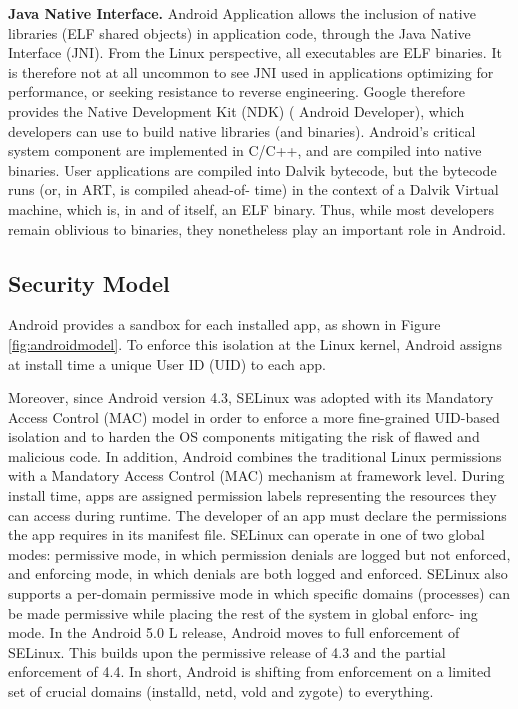 \textbf{Java Native Interface.} Android Application allows the inclusion of native libraries (ELF shared objects) in application code, through the Java Native Interface (JNI).
From the Linux perspective, all executables are ELF binaries. It is therefore not at all uncommon to see JNI used in applications optimizing for performance, or seeking resistance to reverse engineering. Google therefore provides the Native Development Kit (NDK) (                Android Developer), which developers can use to build native libraries (and binaries). Android's critical system  component are implemented in C/C++, and are compiled into native binaries. User applications are compiled into Dalvik bytecode, but the bytecode runs (or, in ART, is compiled ahead-of- time) in the context of a Dalvik Virtual machine, which is, in and of itself, an ELF binary. Thus, while most developers remain oblivious to binaries, they nonetheless play an important role in Android.



\subsection{Security Model} 
Android provides a sandbox for each installed app, as shown in Figure \ref{fig:androidmodel}. To enforce this isolation at the Linux kernel, Android assigns at install time a unique User ID (UID) to each app. 

Moreover, since Android version 4.3, SELinux was adopted with its Mandatory Access Control (MAC) model in order  to enforce a more fine-grained UID-based isolation and to harden the OS components mitigating the risk of flawed and malicious code.  In addition, Android combines the traditional Linux permissions with a Mandatory Access Control (MAC) mechanism at framework level. During install time, apps are assigned permission labels representing the resources they can access during runtime. The developer of an app must declare the permissions the app requires in its manifest file. SELinux can operate in one of two global modes: permissive mode, in which permission denials are logged but not enforced, and enforcing mode, in which denials are both logged and enforced. SELinux also supports a per-domain permissive mode in which specific domains (processes) can be made permissive while placing the rest of the system in global enforc- ing mode. In the Android 5.0 L release, Android moves to full enforcement of SELinux. This builds upon the permissive release of 4.3 and the partial enforcement of 4.4. In short, Android is shifting from enforcement on a limited set of crucial domains (installd, netd, vold and zygote) to everything.

